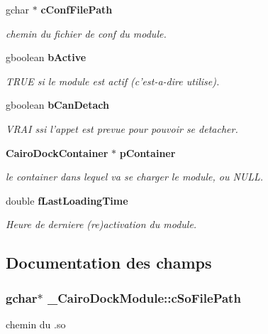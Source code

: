 \begin{CompactItemize}
gchar $\ast$ {\bf cConfFilePath}
\begin{CompactList}\small\item\em chemin du fichier de conf du module. \item\end{CompactList}\item 
gboolean {\bf bActive}
\begin{CompactList}\small\item\em TRUE si le module est actif (c'est-a-dire utilise). \item\end{CompactList}\item 
gboolean {\bf bCanDetach}
\begin{CompactList}\small\item\em VRAI ssi l'appet est prevue pour pouvoir se detacher. \item\end{CompactList}\item 
{\bf CairoDockContainer} $\ast$ {\bf pContainer}
\begin{CompactList}\small\item\em le container dans lequel va se charger le module, ou NULL. \item\end{CompactList}\item 
double {\bf fLastLoadingTime}
\begin{CompactList}\small\item\em Heure de derniere (re)activation du module. \item\end{CompactList}\end{CompactItemize}


\subsection{Documentation des champs}
\subsubsection{\setlength{\rightskip}{0pt plus 5cm}gchar$\ast$ {\bf \_\-CairoDockModule::cSoFilePath}}\label{struct__CairoDockModule_c1411c49bcf48d457ee8620b3c46c01f}


chemin du .so 

